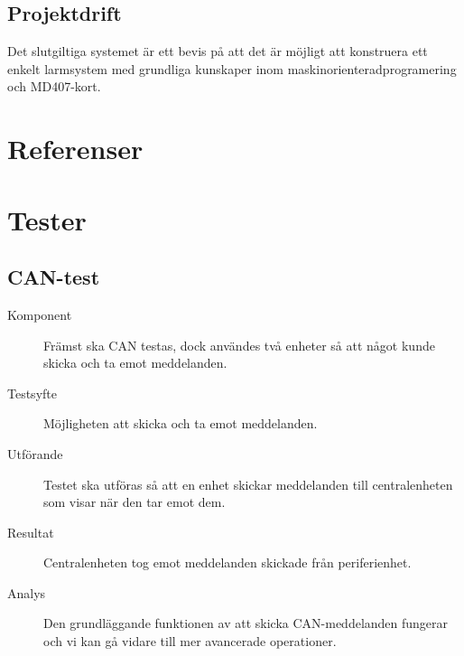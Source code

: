 \documentclass[a4paper]{article}
\begin{document}
\subsection{Projektdrift}
Det slutgiltiga systemet är ett bevis på att det är möjligt att konstruera ett enkelt larmsystem med grundliga kunskaper inom maskinorienteradprogramering och MD407-kort.

\section{Referenser}
\printbibliography[heading=none]

\newpage
\appendix
\section{Tester}
\label{bilaga-tester}
\subsection{CAN-test}
\begin{description}
\item[Komponent] Främst ska CAN testas, dock användes två enheter så att något kunde skicka och ta emot meddelanden.

\item[Testsyfte] Möjligheten att skicka och ta emot meddelanden.

\item[Utförande] Testet ska utföras så att en enhet skickar meddelanden till centralenheten som visar när den tar emot dem.

\item[Resultat] Centralenheten tog emot meddelanden skickade från periferienhet.

\item[Analys] Den grundläggande funktionen av att skicka CAN-meddelanden fungerar och vi kan gå vidare till mer avancerade operationer.
\end{description}
\end{document}
